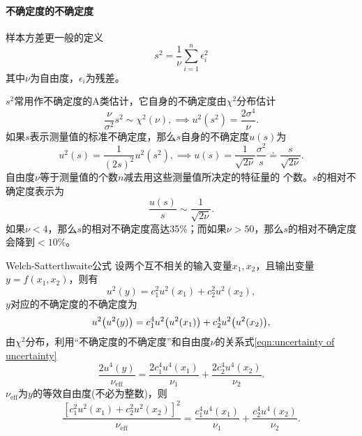 \paragraph{不确定度的不确定度}
样本方差更一般的定义
\[
	s^2=\frac1\nu\sum_{i=1}^n\epsilon_i^2
\]
其中$\nu$为自由度，$\epsilon_i$为残差。

$s^2$常用作不确定度的A类估计，它自身的不确定度由$\chi^2$分布估计
\begin{equation}
	\label{eqn:uncertainty of uncertainty}
	\frac\nu{\sigma^2}s^2\sim\chi^2(\nu),\implies u^2(s^2)=\frac{2\sigma^4}\nu.\tag{$\ast$}
\end{equation}
如果$ s $表示测量值的标准不确定度，那么$ s $自身的不确定度$ u(s) $为
\[
	u^2(s)=\frac1{(2s)^2}u^2(s^2),\implies u(s)=\frac1{\sqrt{2\nu}}\frac{\sigma^2}s\doteq\frac s{\sqrt{2\nu}}.
\]
自由度$\nu$等于测量值的个数$ n $减去用这些测量值所决定的特征量的
个数。$s $的相对不确定度表示为
\[
	\frac{u(s)}s\sim\frac1{\sqrt{2\nu}}.
\]
如果$\nu<4$，那么$ s $的相对不确定度高达35\%；而如果$\nu>50$，那么$ s $的相对不确定度会降到$<10\%$。
\begin{theorem}{Welch-Satterthwaite公式}{}
	设两个互不相关的输入变量$x_1,x_2$，且输出变量$y=f(x_1,x_2)$，则有
	\[
		u^2(y)=c_1^2u^2(x_1)+c_2^2u^2(x_2),
	\]
	$y $对应的不确定度的不确定度为
	\[
		u^2\bigl(u^2(y)\bigr)=c_1^4u^2\bigl(u^2(x_1)\bigr)+c_2^4u^2\bigl(u^2(x_2)\bigr),
	\]
	由$\chi^2$分布，利用“不确定度的不确定度”和自由度$\nu$的关系式\eqref{eqn:uncertainty of uncertainty}
	\[
		\frac{2u^4(y)}{\nu_{\mathrm{eff}}}=\frac{2c_1^4u^4(x_1)}{\nu_1}+\frac{2c_2^4u^4(x_2)}{\nu_2}.
	\]
	$\nu_{\mathrm{eff}}$为$ y $的等效自由度(不必为整数)，则
	\[
		\frac{[c_1^2u^2(x_1)+c_2^2u^2(x_2)]^2}{\nu_{\mathrm{eff}}}=\frac{c_1^4u^4(x_1)}{\nu_1}+\frac{c_2^4u^4(x_2)}{\nu_2}.
	\]
\end{theorem}
